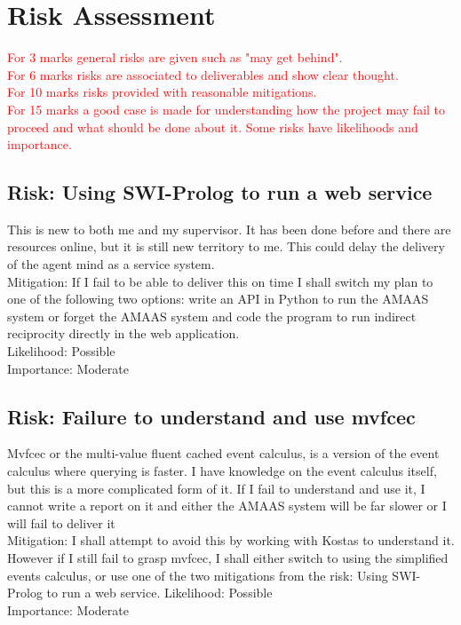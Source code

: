 \documentclass{article}
\begin{document}
\section*{Risk Assessment}

\textcolor{red}{For 3 marks general risks are given such as "may get behind".\\For 6 marks risks are associated to deliverables and show clear thought.\\For 10 marks risks provided with reasonable mitigations.\\For 15 marks a good case is made for understanding how the project may fail to proceed and what should be done about it. Some risks have likelihoods and importance.}

\subsection*{Risk: Using SWI-Prolog to run a web service}
This is new to both me and my supervisor. It has been done before and there are resources online, but it is still new territory to me. This could delay the delivery of the agent mind as a service system.\\
Mitigation: If I fail to be able to deliver this on time I shall switch my plan to one of the following two options: write an API in Python to run the AMAAS system or forget the AMAAS system and code the program to run indirect reciprocity directly in the web application.\\
Likelihood: Possible\\
Importance: Moderate

\subsection*{Risk: Failure to understand and use mvfcec}
Mvfcec or the multi-value fluent cached event calculus, is a version of the event calculus where querying is faster. I have knowledge on the event calculus itself, but this is a more complicated form of it. If I fail to understand and use it, I cannot write a report on it and either the AMAAS system will be far slower or I will fail to deliver it\\
Mitigation: I shall attempt to avoid this by working with Kostas to understand it. However if I still fail to grasp mvfcec, I shall either switch to using the simplified events calculus, or use one of the two mitigations from the risk: Using SWI-Prolog to run a web service.
Likelihood: Possible\\
Importance: Moderate
\end{document}

